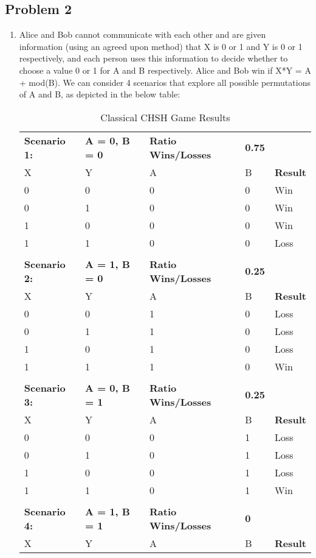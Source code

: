 \documentclass{article}
\begin{document}
\subsection{Problem 2}
    \begin{enumerate}
        \item Alice and Bob cannot communicate with each other and are given information (using an agreed upon method) that X is 0 or 1 and Y is 0 or 1 respectively, and each person uses this information to decide whether to choose a value 0 or 1 for A and B respectively. Alice and Bob win if X*Y = A + mod(B). We can consider 4 scenarios that explore all possible permutations of A and B, as depicted in the below table:
        \begin{table}[H]
\centering
\caption{Classical CHSH Game Results}
\label{my-label}
\begin{tabular}{lllll}
\textbf{Scenario 1:} & \textbf{A = 0, B = 0} & \textbf{Ratio Wins/Losses} & \textbf{0.75} &  \\
X & Y & A & B & \textbf{Result} \\
0 & 0 & 0 & 0 & Win \\
0 & 1 & 0 & 0 & Win \\
1 & 0 & 0 & 0 & Win \\
1 & 1 & 0 & 0 & Loss \\
 &  &  &  &  \\
\textbf{Scenario 2:} & \textbf{A = 1, B = 0} & \textbf{Ratio Wins/Losses} & \textbf{0.25} &  \\
X & Y & A & B & \textbf{Result} \\
0 & 0 & 1 & 0 & Loss \\
0 & 1 & 1 & 0 & Loss \\
1 & 0 & 1 & 0 & Loss \\
1 & 1 & 1 & 0 & Win \\
 &  &  &  &  \\
\textbf{Scenario 3:} & \textbf{A = 0, B = 1} & \textbf{Ratio Wins/Losses} & \textbf{0.25} &  \\
X & Y & A & B & \textbf{Result} \\
0 & 0 & 0 & 1 & Loss \\
0 & 1 & 0 & 1 & Loss \\
1 & 0 & 0 & 1 & Loss \\
1 & 1 & 0 & 1 & Win \\
 &  &  &  &  \\
\textbf{Scenario 4:} & \textbf{A = 1, B = 1} & \textbf{Ratio Wins/Losses} & \textbf{0} &  \\
X & Y & A & B & \textbf{Result} \\

\end{tabular}
\end{table}
\end{enumerate}
\end{document}
